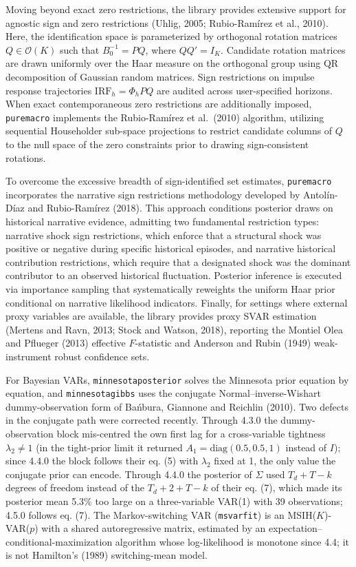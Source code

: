 \documentclass[11pt,letterpaper]{article}
\newcounter{none} %
\renewcommand{\_}{\pmunderscore\allowbreak}
\begin{document}
Moving beyond exact zero restrictions, the library provides extensive support for agnostic sign and zero restrictions (Uhlig, 2005; Rubio-Ramírez et al., 2010). Here, the identification space is parameterized by orthogonal rotation matrices \(Q \in \mathcal{O}(K)\) such that \(B_0^{-1} = P Q\), where \(Q Q' = I_K\). Candidate rotation matrices are drawn uniformly over the Haar measure on the orthogonal group using QR decomposition of Gaussian random matrices. Sign restrictions on impulse response trajectories \(\text{IRF}_h = \Phi_h P Q\) are audited across user-specified horizons. When exact contemporaneous zero restrictions are additionally imposed, \texttt{puremacro} implements the Rubio-Ramírez et al.~(2010) algorithm, utilizing sequential Householder sub-space projections to restrict candidate columns of \(Q\) to the null space of the zero constraints prior to drawing sign-consistent rotations.

To overcome the excessive breadth of sign-identified set estimates, \texttt{puremacro} incorporates the narrative sign restrictions methodology developed by Antolín-Díaz and Rubio-Ramírez (2018). This approach conditions posterior draws on historical narrative evidence, admitting two fundamental restriction types: narrative shock sign restrictions, which enforce that a structural shock was positive or negative during specific historical episodes, and narrative historical contribution restrictions, which require that a designated shock was the dominant contributor to an observed historical fluctuation. Posterior inference is executed via importance sampling that systematically reweights the uniform Haar prior conditional on narrative likelihood indicators. Finally, for settings where external proxy variables are available, the library provides proxy SVAR estimation (Mertens and Ravn, 2013; Stock and Watson, 2018), reporting the Montiel Olea and Pflueger (2013) effective \(F\)-statistic and Anderson and Rubin (1949) weak-instrument robust confidence sets.

For Bayesian VARs, \texttt{minnesota\_posterior} solves the Minnesota prior equation by equation, and \texttt{minnesota\_gibbs} uses the conjugate Normal--inverse-Wishart dummy-observation form of Bańbura, Giannone and Reichlin (2010). Two defects in the conjugate path were corrected recently. Through 4.3.0 the dummy-observation block mis-centred the own first lag for a cross-variable tightness \(\lambda_2 \neq 1\) (in the tight-prior limit it returned \(A_1 = \mathrm{diag}(0.5, 0.5, 1)\) instead of \(I\)); since 4.4.0 the block follows their eq. (5) with \(\lambda_2\) fixed at 1, the only value the conjugate prior can encode. Through 4.4.0 the posterior of \(\Sigma\) used \(T_d + T - k\) degrees of freedom instead of the \(T_d + 2 + T - k\) of their eq. (7), which made its posterior mean 5.3\% too large on a three-variable VAR(1) with 39 observations; 4.5.0 follows eq. (7). The Markov-switching VAR (\texttt{ms\_var\_fit}) is an MSIH(\(K\))-VAR(\(p\)) with a shared autoregressive matrix, estimated by an expectation--conditional-maximization algorithm whose log-likelihood is monotone since 4.4; it is not Hamilton's (1989) switching-mean model.
\end{document}
